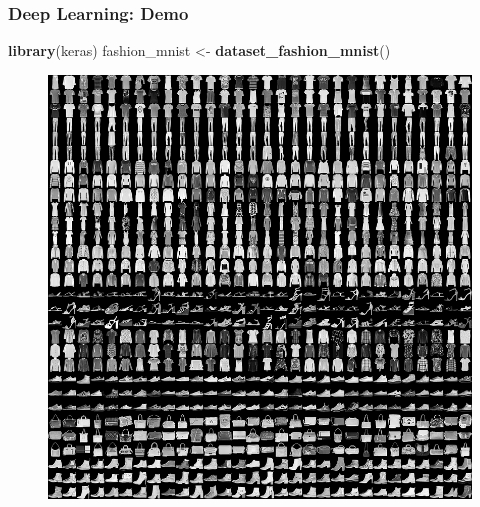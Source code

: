 \documentclass[
  shownotes,
  xcolor={svgnames},
  hyperref={colorlinks,citecolor=DarkBlue,linkcolor=DarkRed,urlcolor=DarkBlue}
  , aspectratio=169]{beamer}
\newenvironment{Shaded}{\begin{snugshade}}{\end{snugshade}}
\newcommand{\KeywordTok}[1]{\textcolor[rgb]{0.13,0.29,0.53}{\textbf{#1}}}
\newcommand{\NormalTok}[1]{#1}
\newcommand{\StringTok}[1]{\textcolor[rgb]{0.31,0.60,0.02}{#1}}
\begin{document}
\begin{frame}[fragile]
\frametitle{Deep Learning: Demo}





\begin{Shaded}
\begin{Highlighting}[]
\KeywordTok{library}\NormalTok{(keras)}
\NormalTok{fashion\_mnist \textless{}{-}}\StringTok{ }\KeywordTok{dataset\_fashion\_mnist}\NormalTok{()}
\end{Highlighting}
\end{Shaded}

  \begin{figure}[H] \centering
            \captionsetup{justification=centering}
              \includegraphics[scale=0.4]{figures/fashion-mnist-sprite}
              
 \end{figure}
\end{frame}
\end{document}
